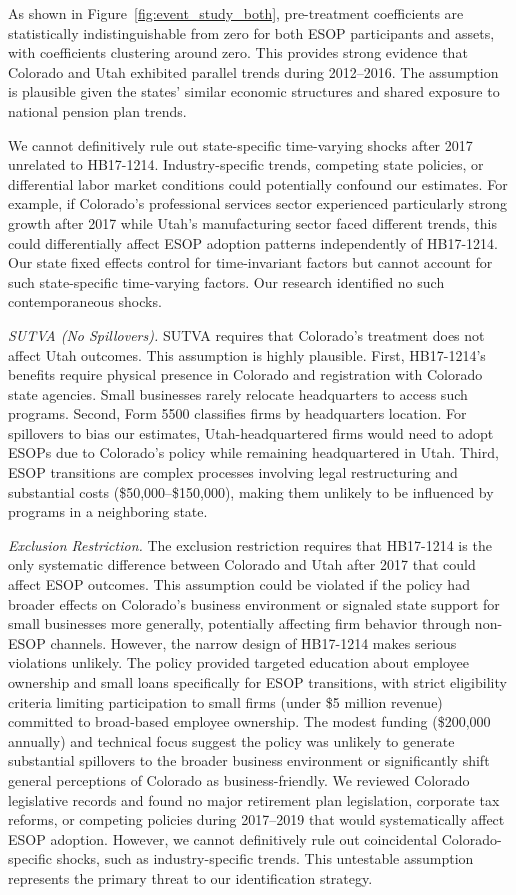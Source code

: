 \documentclass[12pt]{article}
\begin{document}
As shown in Figure~\ref{fig:event_study_both}, pre-treatment coefficients are statistically indistinguishable from zero for both ESOP participants and assets, with coefficients clustering around zero. This provides strong evidence that Colorado and Utah exhibited parallel trends during 2012–2016. The assumption is plausible given the states' similar economic structures and shared exposure to national pension plan trends.

We cannot definitively rule out state-specific time-varying shocks after 2017 unrelated to HB17-1214. Industry-specific trends, competing state policies, or differential labor market conditions could potentially confound our estimates. For example, if Colorado's professional services sector experienced particularly strong growth after 2017 while Utah's manufacturing sector faced different trends, this could differentially affect ESOP adoption patterns independently of HB17-1214. Our state fixed effects control for time-invariant factors but cannot account for such state-specific time-varying factors. Our research identified no such contemporaneous shocks.

\textit{SUTVA (No Spillovers).} SUTVA requires that Colorado's treatment does not affect Utah outcomes. This assumption is highly plausible. First, HB17-1214's benefits require physical presence in Colorado and registration with Colorado state agencies. Small businesses rarely relocate headquarters to access such programs. Second, Form 5500 classifies firms by headquarters location. For spillovers to bias our estimates, Utah-headquartered firms would need to adopt ESOPs due to Colorado's policy while remaining headquartered in Utah. Third, ESOP transitions are complex processes involving legal restructuring and substantial costs (\$50,000–\$150,000), making them unlikely to be influenced by programs in a neighboring state.

\textit{Exclusion Restriction.} The exclusion restriction requires that HB17-1214 is the only systematic difference between Colorado and Utah after 2017 that could affect ESOP outcomes. This assumption could be violated if the policy had broader effects on Colorado's business environment or signaled state support for small businesses more generally, potentially affecting firm behavior through non-ESOP channels. However, the narrow design of HB17-1214 makes serious violations unlikely. The policy provided targeted education about employee ownership and small loans specifically for ESOP transitions, with strict eligibility criteria limiting participation to small firms (under \$5 million revenue) committed to broad-based employee ownership. The modest funding (\$200,000 annually) and technical focus suggest the policy was unlikely to generate substantial spillovers to the broader business environment or significantly shift general perceptions of Colorado as business-friendly. We reviewed Colorado legislative records and found no major retirement plan legislation, corporate tax reforms, or competing policies during 2017–2019 that would systematically affect ESOP adoption. However, we cannot definitively rule out coincidental Colorado-specific shocks, such as industry-specific trends. This untestable assumption represents the primary threat to our identification strategy.
\end{document}
